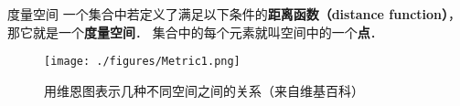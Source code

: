 
\begin{definition}{度量空间}
一个集合中若定义了满足以下条件的\textbf{距离函数（distance function）}， 那它就是一个\textbf{度量空间}． 集合中的每个元素就叫空间中的一个\textbf{点}．
\end{definition}

\begin{figure}[ht]
\centering
\texttt{[image: ./figures/Metric1.png]}
\caption{用维恩图表示几种不同空间之间的关系（来自维基百科）} \label{Metric_fig1}
\end{figure}
